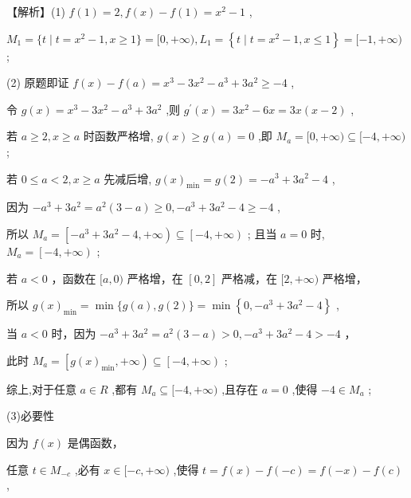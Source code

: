 \documentclass[10pt]{article}
\begin{document}
【解析】(1) \(f\left( 1\right)  = 2,f\left( x\right)  - f\left( 1\right)  = {x}^{2} - 1\) ,

\({M}_{1} = \{ t \mid  t = {x}^{2} - 1,x \geq  1\}  = \lbrack 0, + \infty ),{L}_{1} = \left\{  {t \mid  t = {x}^{2} - 1,x \leq  1}\right\}   = \lbrack  - 1, + \infty )\) ;

(2) 原题即证 \(f\left( x\right)  - f\left( a\right)  = {x}^{3} - 3{x}^{2} - {a}^{3} + 3{a}^{2} \geq   - 4\) ,

令 \(g\left( x\right)  = {x}^{3} - 3{x}^{2} - {a}^{3} + 3{a}^{2}\) ,则 \({g}^{\prime }\left( x\right)  = 3{x}^{2} - {6x} = {3x}\left( {x - 2}\right)\) ,

若 \(a \geq  2,x \geq  a\) 时函数严格增, \(g\left( x\right)  \geq  g\left( a\right)  = 0\) ,即 \({M}_{a} = \lbrack 0, + \infty ) \subseteq  \lbrack  - 4, + \infty )\) ;

若 \(0 \leq  a < 2,x \geq  a\) 先减后增, \(g{\left( x\right) }_{\min } = g\left( 2\right)  =  - {a}^{3} + 3{a}^{2} - 4\) ,

因为 \(- {a}^{3} + 3{a}^{2} = {a}^{2}\left( {3 - a}\right)  \geq  0, - {a}^{3} + 3{a}^{2} - 4 \geq   - 4\) ,

所以 \({M}_{a} = \left\lbrack  {-{a}^{3} + 3{a}^{2} - 4, + \infty }\right)  \subseteq  \left\lbrack  {-4, + \infty }\right)\) ; 且当 \(a = 0\) 时, \({M}_{a} = \left\lbrack  {-4, + \infty }\right)\) ;

若 \(a < 0\) ，函数在 \(\lbrack a,0)\) 严格增，在 \(\left\lbrack  {0,2}\right\rbrack\) 严格减，在 \(\lbrack 2, + \infty )\) 严格增，

所以 \(g{\left( x\right) }_{\min } = \min \{ g\left( a\right) ,g\left( 2\right) \}  = \min \left\{  {0, - {a}^{3} + 3{a}^{2} - 4}\right\}\) ,

当 \(a < 0\) 时，因为 \(- {a}^{3} + 3{a}^{2} = {a}^{2}\left( {3 - a}\right)  > 0, - {a}^{3} + 3{a}^{2} - 4 >  - 4\) ，

此时 \({M}_{a} = \left\lbrack  {g{\left( x\right) }_{\min }, + \infty }\right)  \subseteq  \left\lbrack  {-4, + \infty }\right)\) ;

综上,对于任意 \(a \in  R\) ,都有 \({M}_{a} \subseteq  \lbrack  - 4, + \infty )\) ,且存在 \(a = 0\) ,使得 \(- 4 \in  {M}_{a}\) ;

(3)必要性

因为 \(f\left( x\right)\) 是偶函数，

任意 \(t \in  {M}_{-c}\) ,必有 \(x \in  \lbrack  - c, + \infty )\) ,使得 \(t = f\left( x\right)  - f\left( {-c}\right)  = f\left( {-x}\right)  - f\left( c\right)\) ,
\end{document}
